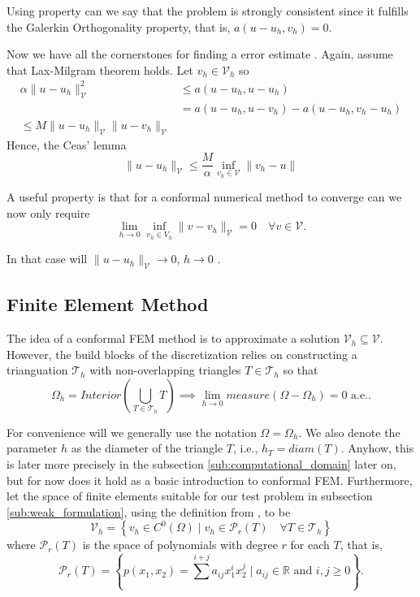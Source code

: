 Using property can  we say that the problem is strongly consistent since it fulfills the Galerkin Orthogonality property, that is,  $ a\left( u -u_{h} , v_{h} \right)  =0$.

Now we have all the cornerstones for finding a error estimate . Again, assume that Lax-Milgram theorem holds. Let $v_{h} \in  \mathcal{V} _{h}$ so
\[
    \begin{split}
\alpha \| u -u_{h} \|_{ \mathcal{V}  }^{ 2 } & \le  a\left( u - u_{h}, u - u_{h}  \right)    \\
&= a\left( u - u_{h}, u -v_{h} \right) - a\left( u -u_{h}, v_{h} - u_{h} \right)  \\
\le  M \| u - u_{h} \|_{ \mathcal{V}  }^{  }  \| u - v_{h} \|_{ \mathcal{V}  }^{  }
    \end{split}
\]
Hence, the Ceas' lemma \cite{quartdiff} \[
\| u - u_{h} \|_{ \mathcal{V}  }^{  }  \le  \frac{M}{\alpha } \inf_{v_{h} \in \mathcal{V} } \|  v_{h} - u \|_{  }^{  }
\]

A useful property is that for a conformal numerical method to converge can we now only require \[
\lim_{h \to 0}  \inf_{v_{h} \in  V_{h}}  \| v - v_{h} \|_{ \mathcal{V }  }^{  } = 0 \quad  \forall v \in \mathcal{V}.
\]

In that case will $\| u - u_{h} \|_{ \mathcal{V}  }^{  }  \to  0$, $h \to  0$ .



\subsection{Finite Element Method}%
\label{sub:finite_element_method}
The idea of a conformal FEM method is to approximate a solution $\mathcal{V}_h \subseteq \mathcal{V}  $. However, the build blocks of the discretization relies on constructing a trianguation $\mathcal{T } _h$ with non-overlapping triangles  $T \in
\mathcal{T}_{h} $ so that \[
\Omega _{h} = Interior(\bigcup_{T \in  \mathcal{T} _{h}}^{} T) \implies \lim_{h\to 0} measure(\Omega - \Omega _{h}) = 0 \text{ a.e.}.
\]

For convenience will we generally use the notation $\Omega  = \Omega  _{h}$. We also denote the parameter $h$ as the diameter of the triangle $T$, i.e., $h_{T} = diam(T)$. Anyhow, this is later more precisely in the subsection
\ref{sub:computational_domain} later on, but for now does it hold as a basic introduction to conformal FEM.
Furthermore, let the space of finite elements suitable for our test problem in subsection \ref{sub:weak_formulation}, using the definition from \cite{quartdiff}, to be
\[
\mathcal{V} _{h} = \left\{ v_{h} \in C^{0}\left( \Omega  \right)  \mid  v_{h} \in \mathcal{P} _{r}\left( T \right)  \quad \forall T \in \mathcal{T} _{h}  \right\}
\]
where $\mathcal{P } _{r}\left( T \right) $ is the space of polynomials with degree $r$ for each $T$, that is,
\[
\mathcal{P} _{r}\left( T \right)  = \left\{ p\left( x_{1}, x_{2} \right) = \sum_{}^{i + j}  a_{ij} x^{i}_{1} x^{j}_{2}  \mid  a_{ij} \in \mathbb{R}  \text{ and } i,j \ge  0   \right\}.
\]

